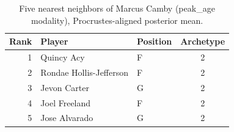 \begin{table}[htbp]
  \centering\small
  \begin{tabular}{rllc}
    \toprule
    Rank & Player & Position & Archetype \\
    \midrule
    1 & Quincy Acy & F & 2 \\
    2 & Rondae Hollis-Jefferson & F & 2 \\
    3 & Jevon Carter & G & 2 \\
    4 & Joel Freeland & F & 2 \\
    5 & Jose Alvarado & G & 2 \\
    \bottomrule
  \end{tabular}
  \caption{Five nearest neighbors of Marcus Camby (peak_age modality), Procrustes-aligned posterior mean.}
  \label{tab:Marcus_Camby_neighbors_peak_age}
\end{table}

